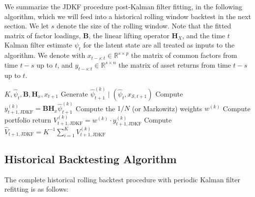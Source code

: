 \documentclass[11pt]{article}
\theoremstyle{plain}
\theoremstyle{definition}
\theoremstyle{remark}
\numberwithin{equation}{section}
\begin{document}
We summarize the JDKF procedure post-Kalman filter fitting, in the following algorithm, which we will feed into a historical rolling window backtest in the next section. We let $s$ denote the size of the rolling window. Note that the fitted matrix of factor loadings, $\mathbf{B}$, the linear lifting operator $\mathbf{H}_X$, and the time $t$ Kalman filter estimate $\psi_t$ for the latent state are all treated as inputs to the algorithm. We denote with $x_{t-s:t} \in \mathbb{R}^{s \times p}$ the matrix of common factors from time $t-s$ up to $t$, and $y_{t-s:t} \in \mathbb{R}^{s \times n}$ the matrix of asset returns from time $t-s$ up to $t$. 

\begin{algorithm}[H]
\caption{JDKF Portfolio Simulation}\label{alg:jdkf}
\begin{algorithmic}[1]
\Require $K, \hat{\psi}_t, \mathbf{B}, \mathbf{H}_x, x_{t+1}$
    \State Generate $\hat{\psi}_{t+1}^{(k)} \mid (\hat{\psi}_t, x_{\mathcal{S},t+1})$ 
    \State Compute $y_{t+1, \mathrm{JDKF}}^{(k)}=\mathbf{B} \mathbf{H}_x\hat{\psi}_{t+1}^{(k)}$
    \State Compute the $1/N$ (or Markowitz) weights $w^{(k)}$
    \State Compute portfolio return $V_{t+1, \mathrm{JDKF}}^{(k)}=w^{(k)} \cdot y_{t+1,\mathrm{JDKF}}^{(k)}$
\EndFor
\State Compute $\hat{V}_{t+1, \mathrm{JDKF}}=K^{-1}\sum_{i=1}^K V_{t+1,\mathrm{JDKF}}^{(k)}$
\end{algorithmic}
\end{algorithm}


\subsection{Historical Backtesting Algorithm}
\label{app:backtest_algorithm}

The complete historical rolling backtest procedure with periodic Kalman filter refitting is as follows:
\end{document}
